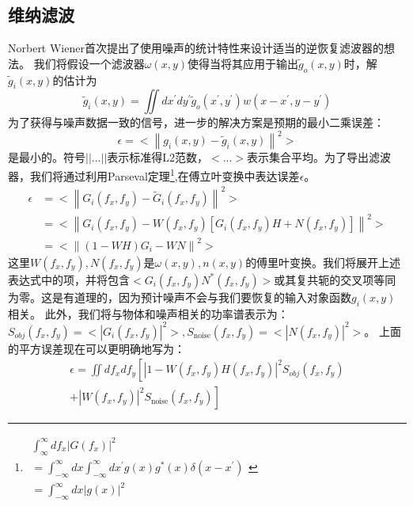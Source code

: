 \documentclass[12pt, UTF8]{ctexart}%
\numberwithin{equation}{section}
\numberwithin{figure}{section}
\newcommand{\InsertEqution}[2]{\begin{equation}
  \label{#1}
   #2
 \end{equation}}
\newcommand{\InsertInlineEq}[1]{$#1$}
\begin{document}
\begin{sloppypar}
\subsection{维纳滤波}
Norbert Wiener首次提出了使用噪声的统计特性来设计适当的逆恢复滤波器的想法。 我们将假设一个滤波器\InsertInlineEq{\omega(x,y)}使得当将其应用于输出\InsertInlineEq{\tilde{g}_{o}(x, y)}时，解\InsertInlineEq{\tilde{g}_{i}(x, y)}的估计为
\InsertEqution{5.9}{\tilde{g}_{i}(x, y)=\iint d x^{\prime} d y^{\prime} \tilde{g}_{o}\left(x^{\prime}, y^{\prime}\right) w\left(x-x^{\prime}, y-y^{\prime}\right)}
为了获得与噪声数据一致的信号，进一步的解决方案是预期的最小二乘误差：
\InsertEqution{5.10}{\epsilon=<\left\|g_{i}(x, y)-\tilde{g}_{i}(x, y)\right\|^{2}>}
是最小的。符号\InsertInlineEq{||...||}表示标准得L2范数，\InsertInlineEq{<...>}表示集合平均。为了导出滤波器，我们将通过利用Parseval定理\footnote{\InsertInlineEq{\begin{array}{l}
  \int_{\infty}^{\infty} d f_{x}\left|G\left(f_{x}\right)\right|^{2} \\
  =\int_{-\infty}^{\infty} d x \int_{-\infty}^{\infty} d x^{\prime} g(x) g^{*}(x) \delta\left(x-x^{\prime}\right) \\
  =\int_{-\infty}^{\infty} d x|g(x)|^{2}
  \end{array}}},在傅立叶变换中表达误差\InsertInlineEq{\epsilon}。
  \InsertEqution{5.11}{\begin{aligned}
    \epsilon &=<\left\|G_{i}\left(f_{x}, f_{y}\right)-\tilde{G}_{i}\left(f_{x}, f_{y}\right)\right\|^{2}>\\
    &=<\left\|G_{i}\left(f_{x}, f_{y}\right)-W\left(f_{x}, f_{y}\right)\left[G_{i}\left(f_{x}, f_{y}\right) H+N\left(f_{x}, f_{y}\right)\right]\right\|^{2}>\\
    &=<\left\|(1-W H) G_{i}-W N\right\|^{2}>
    \end{aligned}}
    这里\InsertInlineEq{W(f_x,f_y),N(f_x,f_y)}是\InsertInlineEq{\omega(x,y),n(x,y)}的傅里叶变换。我们将展开上述表达式中的项，并将包含\InsertInlineEq{<G_{i}\left(f_{x}, f_{y}\right) N^{*}\left(f_{x}, f_{y}\right)>}或其复共轭的交叉项等同为零。这是有道理的，因为预计噪声不会与我们要恢复的输入对象函数\InsertInlineEq{{g}_{i}(x, y)}相关。
    此外，我们将与物体和噪声相关的功率谱表示为：\InsertInlineEq{S_{o b j}\left(f_{x}, f_{y}\right)=<\left|G_{i}\left(f_{x}, f_{y}\right)\right|^{2}>,S_{\text {noise}}\left(f_{x}, f_{y}\right)=<\left|N\left(f_{x}, f_{y}\right)\right|^{2}>}。
    上面的平方误差现在可以更明确地写为：
    \InsertEqution{5.12}{\begin{aligned}
      {\epsilon=\iint d f_{x} d f_{y}\left[\left|1-W\left(f_{x}, f_{y}\right) H\left(f_{x}, f_{y}\right)\right|^{2} S_{o b j}\left(f_{x}, f_{y}\right)\right.}\\{\left.+\left|W\left(f_{x}, f_{y}\right)\right|^{2} S_{\text {noise}}\left(f_{x}, f_{y}\right)\right]}

\end{aligned}}
\end{sloppypar}
\end{document}
